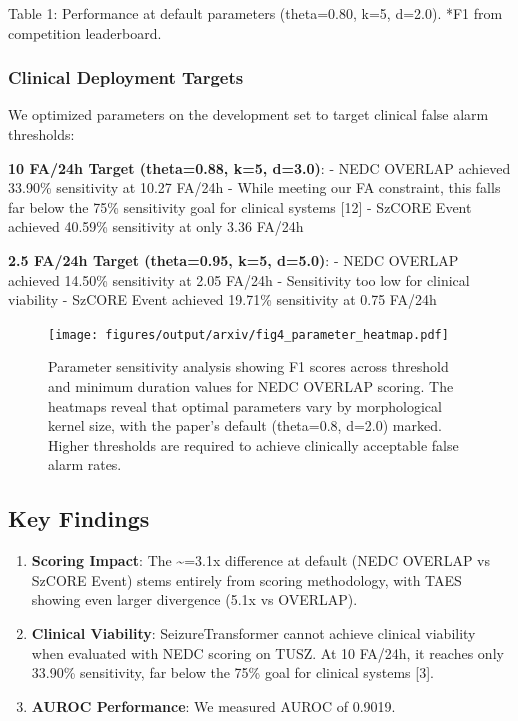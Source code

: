 Table 1: Performance at default parameters (theta=0.80, k=5, d=2.0). *F1
from competition leaderboard.

\hypertarget{clinical-deployment-targets}{%
\subsubsection{Clinical Deployment
Targets}\label{clinical-deployment-targets}}

We optimized parameters on the development set to target clinical false
alarm thresholds:

\textbf{10 FA/24h Target (theta=0.88, k=5, d=3.0)}: - NEDC OVERLAP
achieved 33.90\% sensitivity at 10.27 FA/24h - While meeting our FA
constraint, this falls far below the 75\% sensitivity goal for clinical
systems {[}12{]} - SzCORE Event achieved 40.59\% sensitivity at only
3.36 FA/24h

\textbf{2.5 FA/24h Target (theta=0.95, k=5, d=5.0)}: - NEDC OVERLAP
achieved 14.50\% sensitivity at 2.05 FA/24h - Sensitivity too low for
clinical viability - SzCORE Event achieved 19.71\% sensitivity at 0.75
FA/24h

\begin{figure}
\hypertarget{fig:parameter-heatmap}{%
\centering
\texttt{[image: figures/output/arxiv/fig4\_parameter\_heatmap.pdf]}
\caption{Parameter sensitivity analysis showing F1 scores across
threshold and minimum duration values for NEDC OVERLAP scoring. The
heatmaps reveal that optimal parameters vary by morphological kernel
size, with the paper's default (theta=0.8, d=2.0) marked. Higher
thresholds are required to achieve clinically acceptable false alarm
rates.}\label{fig:parameter-heatmap}
}
\end{figure}

\hypertarget{key-findings}{%
\subsection{Key Findings}\label{key-findings}}

\begin{enumerate}
\def\labelenumi{\arabic{enumi}.}
\item
  \textbf{Scoring Impact}: The \textasciitilde=3.1x difference at
  default (NEDC OVERLAP vs SzCORE Event) stems entirely from scoring
  methodology, with TAES showing even larger divergence (5.1x vs
  OVERLAP).
\item
  \textbf{Clinical Viability}: SeizureTransformer cannot achieve
  clinical viability when evaluated with NEDC scoring on TUSZ. At 10
  FA/24h, it reaches only 33.90\% sensitivity, far below the 75\% goal
  for clinical systems {[}3{]}.
\item
  \textbf{AUROC Performance}: We measured AUROC of 0.9019.
\end{enumerate}

